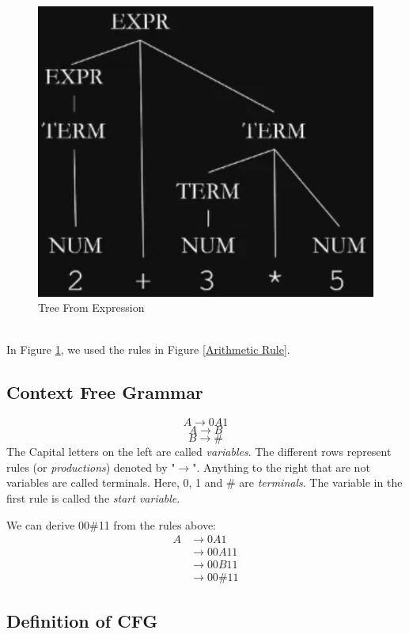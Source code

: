 \documentclass{article}
\begin{document}
    \begin{figure}[h]
        \centerline{
            \includegraphics[scale=0.3]{Expression To Tree.png}
        }
        \caption{Tree From Expression}
        \label{ExpToTree}
    \end{figure}
    \\
    In Figure \ref{ExpToTree}, we used the rules in Figure \ref{Arithmetic Rule}.
    \subsection*{Context Free Grammar}
    $$A\to 0A1$$
    $$A\to B$$
    $$B\to \#$$
    The Capital letters on the left are called \emph{variables}. The different rows represent rules (or \emph{productions}) denoted by "$\to$". Anything to the right that are not variables are called terminals. Here, 0, 1 and \# are \emph{terminals}. The variable in the first rule is called the \emph{start variable}.
    
    We can derive 00\#11 from the rules above:
    \begin{equation}
        \begin{split}
            A &\to 0A1\\
            &\to 00A11\\
            &\to 00B11\\
            &\to 00\#11
        \end{split}
    \end{equation}
    \subsection*{Definition of CFG}
    
\end{document}
